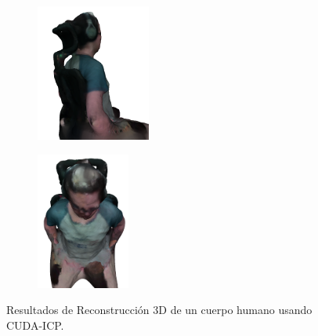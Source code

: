 \begin{figure}[h]
\begin{subfigure}[t]{0.2\textheight}
    \end{subfigure}
    \begin{subfigure}[t]{0.2\textheight}
    	\centering
        \includegraphics[height=4.5cm]{archivos/experimentacion-5-resultado-malla-4.png}
    \end{subfigure}
    \begin{subfigure}[t]{0.2\textheight}
    	\centering
        \includegraphics[height=4.5cm]{archivos/experimentacion-5-resultado-malla-5.png}
    \end{subfigure}
    \caption{Resultados de Reconstrucción 3D de un cuerpo humano usando CUDA-ICP.}
    \label{fig:resultados-reconstruccion-cuerpo-cuda}
\end{figure}

